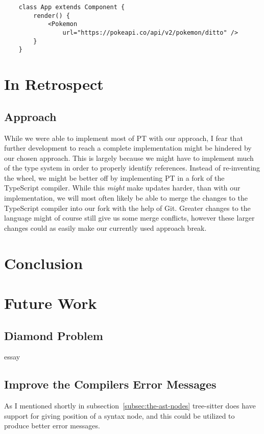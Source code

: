\begin{verbatim}
    class App extends Component {
        render() {
            <Pokemon
                url="https://pokeapi.co/api/v2/pokemon/ditto" />
        }
    }
\end{verbatim}

\section{In Retrospect}\label{sec:in-retrospect}

\subsection{Approach}\label{subsec:result-approach}

While we were able to implement most of PT with our approach, I fear that further development to reach a complete implementation might be hindered by our chosen approach.
This is largely because we might have to implement much of the type system in order to properly identify references.
Instead of re-inventing the wheel, we might be better off by implementing PT in a fork of the TypeScript compiler.
While this \textit{might} make updates harder, than with our implementation, we will most often likely be able to merge the changes to the TypeScript compiler into our fork with the help of Git.
Greater changes to the language might of course still give us some merge conflicts, however these larger changes could as easily make our currently used approach break.

\section{Conclusion}\label{sec:result-conclusion}


\section{Future Work}\label{sec:future-work}

\subsection{Diamond Problem}\label{subsec:diamond-problem}

essay

\subsection{Improve the Compilers Error Messages}\label{subsec:compiler-with-focus-on-error-messages}

As I mentioned shortly in subsection~\vref{subsec:the-ast-nodes} tree-sitter does have support for giving position of a syntax node, and this could be utilized to produce better error messages.
